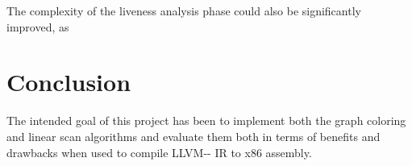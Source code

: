 \documentclass{article}
\begin{document}
The complexity of the liveness analysis phase could also be significantly improved, as 


\section{Conclusion}

The intended goal of this project has been to implement both the graph coloring and linear scan algorithms and evaluate them both in terms of benefits and drawbacks when used to compile LLVM-{}- IR to x86 assembly.





\printbibliography 


\appendix

\newpage

\end{document}
